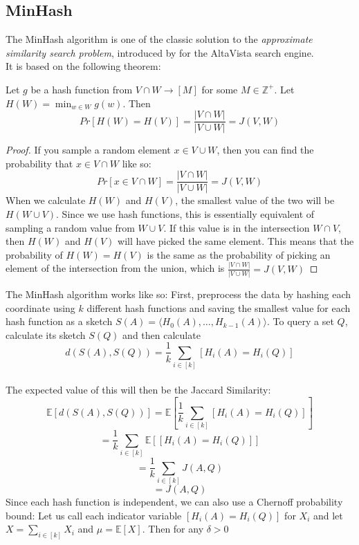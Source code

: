 \subsection{MinHash}
The MinHash algorithm is one of the classic solution to the \textit{approximate similarity search problem}, introduced by \citet{broder1997minhash} for the AltaVista search engine.\\
It is based on the following theorem:
\begin{theorem}
    \label{thm:minhash}
    Let $g$ be a hash function from $V \cap W \rightarrow [M]$ for some $M \in \mathbb{Z}^+$. Let $H(W)=\min_{w\in W} g(w)$. Then
    $$Pr[H(W)=H(V)]=\frac{|V\cap W|}{|V \cup W|}= J(V,W)$$
\end{theorem}
\begin{proof}
    If you sample a random element $x \in V \cup W$, then you can find the probability that $x \in V\cap W$ like so:
    $$Pr[x\in V \cap W]=\frac{|V\cap W|}{|V \cup W|}= J(V,W)$$
    When we calculate $H(W)$ and $H(V)$, the smallest value of the two will be $H(W\cup V)$. Since we use hash functions, this is essentially equivalent of sampling a random value from $W\cup V$. If this value is in the intersection $W\cap V$, then $H(W)$ and $H(V)$ will have picked the same element. This means that the probability of $H(W)=H(V)$ is the same as the probability of picking an element of the intersection from the union, which is $\frac{|V\cap W|}{|V\cup W|}=J(V,W)$
\end{proof}
The MinHash algorithm works like so: First, preprocess the data by hashing each coordinate using $k$ different hash functions and saving the smallest value for each hash function as a sketch $S(A)=\langle H_0(A), \dots, H_{k-1}(A)\rangle$.
To query a set $Q$, calculate its sketch $S(Q)$ and then calculate $$d(S(A),S(Q))=\frac{1}{k}\sum_{i\in [k]}[H_i(A)=H_i(Q)]$$\\
The expected value of this will then be the Jaccard Similarity:
$$\mathbb{E}[d(S(A),S(Q))]=\mathbb{E}[\frac{1}{k}\sum_{i\in [k]}[H_i(A)=H_i(Q)]]$$
$$=\frac{1}{k}\sum_{i\in [k]}\mathbb{E}[[H_i(A)=H_i(Q)]]$$
$$=\frac{1}{k}\sum_{i\in [k]}J(A,Q)$$
$$=J(A,Q)$$
Since each hash function is independent, we can also use a Chernoff probability bound: Let us call each indicator variable $[H_i(A)=H_i(Q)]$ for $X_i$ and let $X=\sum_{i\in [k]}X_i$ and $\mu = \mathbb{E}[X]$. Then for any $\delta > 0$
